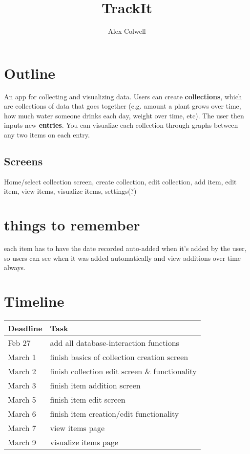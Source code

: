 \documentclass[12pt,a4paper]{article}
\author{Alex Colwell}
\title{TrackIt}
\begin{document}
\maketitle

\section{Outline}
An app for collecting and visualizing data. Users can create \textbf{collections}, which are collections of data that goes together (e.g. amount a plant grows over time, how much water someone drinks each day, weight over time, etc). The user then inputs new \textbf{entries}. You can visualize each collection through graphs between any two items on each entry.

\subsection{Screens}
Home/select collection screen, create collection, edit collection, add item, edit item, view items, visualize items, settings(?)

\section{things to remember}
each item has to have the date recorded auto-added when it's added by the user, so users can see when it was added automatically and view additions over time always.

\section{Timeline}
\begin{table}[!h]
\begin{tabular}{ll}
Deadline & Task\\
\hline 

 Feb 27  &  add all database-interaction functions\\
 March 1 &  finish basics of collection creation screen\\
 March 2 &   finish collection edit screen \& functionality\\
 March 3 &  finish item addition screen\\
 March 5 &  finish item edit screen\\
 March 6 &  finish item creation/edit functionality\\
 March 7 &  view items page\\
 March 9 &  visualize items page\\
\end{tabular}
\end{table}
\end{document}
